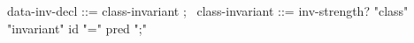 \begin{syntax}
  data-inv-decl ::= class-invariant ;
  \
  class-invariant ::= {inv-strength?} "class" "invariant" 
                      id "=" pred ";" 
\end{syntax}
